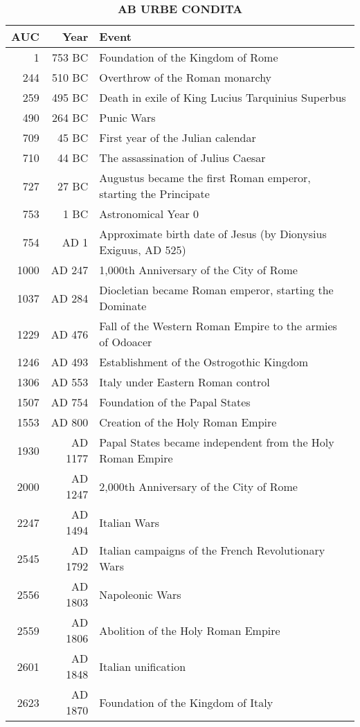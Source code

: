 \documentclass{article}
\begin{document}
\begin{table}[htbp]
\centering
\caption{\large \textbf{AB URBE CONDITA}}
\begin{tabular}{rrl}
\toprule
AUC & Year & Event \\
\midrule
1     & 753 BC & Foundation of the Kingdom of Rome \\
244   & 510 BC & Overthrow of the Roman monarchy \\
259   & 495 BC & Death in exile of King Lucius Tarquinius Superbus \\
490   & 264 BC & Punic Wars \\
709   & 45 BC & First year of the Julian calendar \\
710   & 44 BC & The assassination of Julius Caesar \\
727   & 27 BC & Augustus became the first Roman emperor, starting the Principate \\
753   & 1 BC  & Astronomical Year 0 \\
754   & AD 1 & Approximate birth date of Jesus (by Dionysius Exiguus, AD 525) \\
1000  & AD 247 & 1,000th Anniversary of the City of Rome \\
1037  & AD 284 & Diocletian became Roman emperor, starting the Dominate \\
1229  & AD 476 & Fall of the Western Roman Empire to the armies of Odoacer \\
1246  & AD 493 & Establishment of the Ostrogothic Kingdom \\
1306  & AD 553 & Italy under Eastern Roman control \\
1507  & AD 754 & Foundation of the Papal States \\
1553  & AD 800 & Creation of the Holy Roman Empire \\
1930  & AD 1177 & Papal States became independent from the Holy Roman Empire \\
2000  & AD 1247 & 2,000th Anniversary of the City of Rome \\
2247  & AD 1494 & Italian Wars \\
2545  & AD 1792 & Italian campaigns of the French Revolutionary Wars \\
2556  & AD 1803 & Napoleonic Wars \\
2559  & AD 1806 & Abolition of the Holy Roman Empire \\
2601  & AD 1848 & Italian unification \\
2623  & AD 1870 & Foundation of the Kingdom of Italy \\

\end{tabular}
\end{table}
\end{document}
